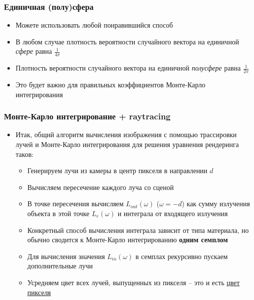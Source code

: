 \documentclass[10pt]{beamer}
\begin{document}
\begin{frame}[fragile]
\frametitle{Единичная (полу)сфера}
\begin{itemize}
\item Можете использовать любой понравившийся способ
\pause
\item В любом случае плотность вероятности случайного вектора на единичной \textit{сфере} равна \begin{math}\frac{1}{4\pi}\end{math}
\pause
\item Плотность вероятности случайного вектора на единичной \textit{полусфере} равна \begin{math}\frac{1}{2\pi}\end{math}
\pause
\item Это будет важно для правильных коэффициентов Монте-Карло интегрирования
\end{itemize}
\end{frame}

\begin{frame}[fragile]
\frametitle{Монте-Карло интегрирование + raytracing}
\begin{itemize}
\item Итак, общий алгоритм вычисления изображения с помощью трассировки лучей и Монте-Карло интегрирования для решения уравнения рендеринга таков:
\pause
\begin{itemize}
\item Генерируем лучи из камеры в центр пикселя в направлении \begin{math}d\end{math}
\pause
\item Вычисляем пересечение каждого луча со сценой
\pause
\item В точке пересечения вычисляем \begin{math}L_{out}(\omega)\end{math} (\begin{math}\omega=-d\end{math}) как сумму излучения объекта в этой точке \begin{math}L_e(\omega)\end{math} и интеграла от входящего излучения
\pause
\item Конкретный способ вычисления интеграла зависит от типа материала, но обычно сводится к Монте-Карло интегрированию \textbf{одним семплом}
\pause
\item Для вычисления значения \begin{math}L_{in}(\omega)\end{math} в семплах рекурсивно пускаем дополнительные лучи
\pause
\item Усредняем цвет всех лучей, выпущенных из пикселя -- это и есть \underline{цвет пикселя}
\end{itemize}
\end{itemize}
\end{frame}
\end{document}
